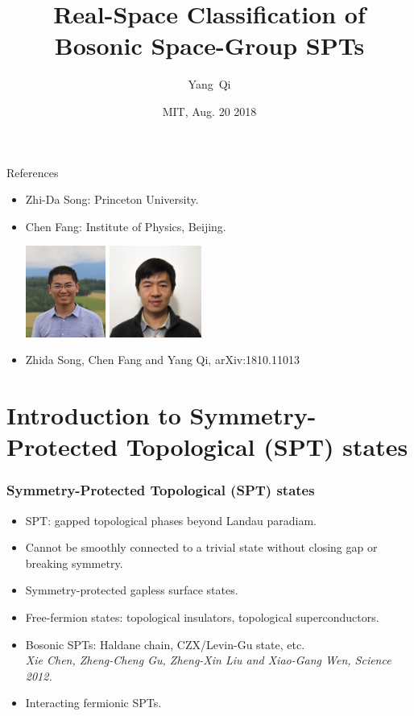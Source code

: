 \documentclass[xcolor=table, 10pt, aspectratio=43]{beamer}
\title[Space-group SPTs] %
{Real-Space Classification of Bosonic Space-Group SPTs}
\author[Y Qi] %
{Yang~Qi}
\institute[Fudan] %
{Department of Physics, Fudan University}
\date{MIT, Aug. 20 2018}
\begin{document}
\begin{frame}
  \titlepage
\end{frame}

\begin{frame}{References}
\begin{itemize}
\item Zhi-Da Song: Princeton University.
\item Chen Fang: Institute of Physics, Beijing.
\begin{center}
	\includegraphics[height=3cm]{../people/zhidasong}
	\includegraphics[height=3cm]{../people/chenfang}
\end{center}
\item Zhida Song, Chen Fang and Yang Qi, arXiv:1810.11013
\end{itemize}
\end{frame}

\section{Introduction to Symmetry-Protected Topological (SPT) states}

\begin{frame}
  \frametitle{Symmetry-Protected Topological (SPT) states}
\begin{itemize}
\item SPT: gapped topological phases beyond Landau paradiam.
\item Cannot be smoothly connected to a trivial state without closing gap or breaking symmetry.
\item Symmetry-protected gapless surface states.
\item Free-fermion states: topological insulators, topological superconductors.
\item Bosonic SPTs: Haldane chain, CZX/Levin-Gu state, etc.\\
\emph{Xie Chen, Zheng-Cheng Gu, Zheng-Xin Liu and Xiao-Gang Wen, Science 2012.}
\item Interacting fermionic SPTs.
\end{itemize}
\end{frame}
\end{document}
